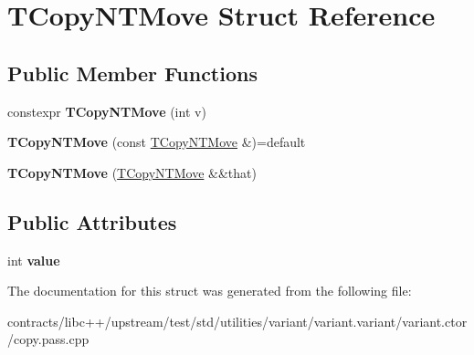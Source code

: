 \hypertarget{struct_t_copy_n_t_move}{}\section{T\+Copy\+N\+T\+Move Struct Reference}
\label{struct_t_copy_n_t_move}
\subsection*{Public Member Functions}
\begin{DoxyCompactItemize}
\item 
\mbox{\label{struct_t_copy_n_t_move_a8ffa89a7134b68446774d4b22958dc8e}} 
constexpr {\bfseries T\+Copy\+N\+T\+Move} (int v)
\item 
\mbox{\label{struct_t_copy_n_t_move_a9818754c437e333e141eede7ae732ac1}} 
{\bfseries T\+Copy\+N\+T\+Move} (const \mbox{\hyperlink{struct_t_copy_n_t_move}{T\+Copy\+N\+T\+Move}} \&)=default
\item 
\mbox{\label{struct_t_copy_n_t_move_ab920df40cc736fd2215cac32fd96cd1a}} 
{\bfseries T\+Copy\+N\+T\+Move} (\mbox{\hyperlink{struct_t_copy_n_t_move}{T\+Copy\+N\+T\+Move}} \&\&that)
\end{DoxyCompactItemize}
\subsection*{Public Attributes}
\begin{DoxyCompactItemize}
\item 
\mbox{\label{struct_t_copy_n_t_move_a0deeaf3c4e0dc4c8acd06bf92327e878}} 
int {\bfseries value}
\end{DoxyCompactItemize}


The documentation for this struct was generated from the following file\+:\begin{DoxyCompactItemize}
\item 
contracts/libc++/upstream/test/std/utilities/variant/variant.\+variant/variant.\+ctor/copy.\+pass.\+cpp\end{DoxyCompactItemize}
